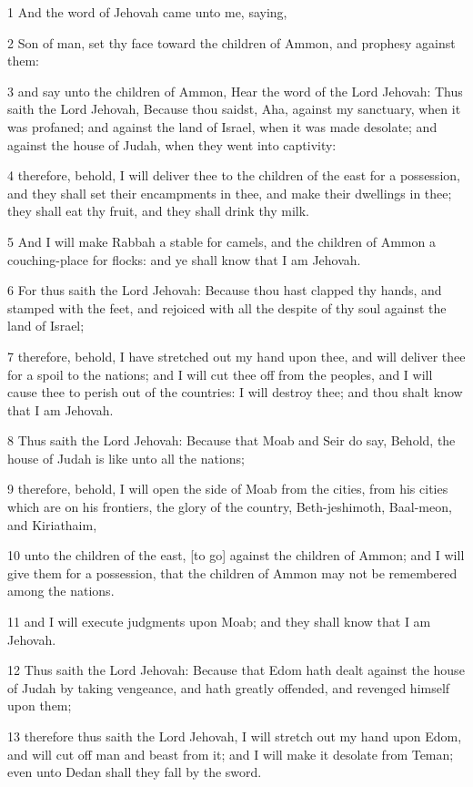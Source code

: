 \par 1 And the word of Jehovah came unto me, saying,
\par 2 Son of man, set thy face toward the children of Ammon, and prophesy against them:
\par 3 and say unto the children of Ammon, Hear the word of the Lord Jehovah: Thus saith the Lord Jehovah, Because thou saidst, Aha, against my sanctuary, when it was profaned; and against the land of Israel, when it was made desolate; and against the house of Judah, when they went into captivity:
\par 4 therefore, behold, I will deliver thee to the children of the east for a possession, and they shall set their encampments in thee, and make their dwellings in thee; they shall eat thy fruit, and they shall drink thy milk.
\par 5 And I will make Rabbah a stable for camels, and the children of Ammon a couching-place for flocks: and ye shall know that I am Jehovah.
\par 6 For thus saith the Lord Jehovah: Because thou hast clapped thy hands, and stamped with the feet, and rejoiced with all the despite of thy soul against the land of Israel;
\par 7 therefore, behold, I have stretched out my hand upon thee, and will deliver thee for a spoil to the nations; and I will cut thee off from the peoples, and I will cause thee to perish out of the countries: I will destroy thee; and thou shalt know that I am Jehovah.
\par 8 Thus saith the Lord Jehovah: Because that Moab and Seir do say, Behold, the house of Judah is like unto all the nations;
\par 9 therefore, behold, I will open the side of Moab from the cities, from his cities which are on his frontiers, the glory of the country, Beth-jeshimoth, Baal-meon, and Kiriathaim,
\par 10 unto the children of the east, [to go] against the children of Ammon; and I will give them for a possession, that the children of Ammon may not be remembered among the nations.
\par 11 and I will execute judgments upon Moab; and they shall know that I am Jehovah.
\par 12 Thus saith the Lord Jehovah: Because that Edom hath dealt against the house of Judah by taking vengeance, and hath greatly offended, and revenged himself upon them;
\par 13 therefore thus saith the Lord Jehovah, I will stretch out my hand upon Edom, and will cut off man and beast from it; and I will make it desolate from Teman; even unto Dedan shall they fall by the sword.
